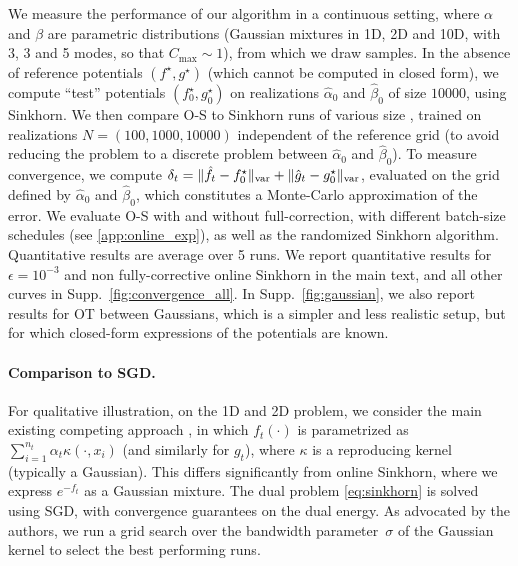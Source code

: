We measure the performance of our algorithm in a
 continuous setting, where $\alpha$ and $\beta$ are  parametric
distributions (Gaussian mixtures in 1D, 2D and 10D, with 3, 3 and 5 modes, so
that $C_{\max} \sim 1$), from which we draw samples. In the absence of reference
potentials $(f^\star, g^\star)$ (which cannot be computed in closed form), 
we compute ``test'' potentials $(f^\star_0, g^\star_0)$ on realizations $\hat
\alpha_0$ and $\hat \beta_0$ of size $10000$, using Sinkhorn. We then compare
O-S to Sinkhorn runs of various size , trained on realizations $N=(100,1000,
10000)$ independent of the reference grid (to avoid reducing the problem to a
discrete problem between $\hat \alpha_0$ and $\hat \beta_0$). To measure
convergence, we compute $\delta_t = \Vert \hat f_t - f^\star_0 \Vert_{\text{\upshape var}} +
\Vert \hat g_t -  g_0^\star \Vert_{\text{\upshape var}}$, evaluated on the grid defined by
$\hat \alpha_0$ and $\hat \beta_0$, which constitutes a Monte-Carlo approximation of the error. 
%
We evaluate O-S with and without full-correction, with
different batch-size schedules (see \autoref{app:online_exp}), as well as the randomized Sinkhorn algorithm. Quantitative results are average over 5 runs. We report quantitative results for $\epsilon = 10^{-3}$ and non fully-corrective online Sinkhorn in the main text, and all other curves in Supp.~\autoref{fig:convergence_all}. In
Supp.~\autoref{fig:gaussian}, we also report results for OT between Gaussians, which is a simpler and less realistic setup, but for which closed-form expressions of the potentials are known.

\paragraph{Comparison to SGD.}\label{sec:compare}
%
For qualitative illustration, on the 1D and 2D problem, we consider the main existing competing
approach \citep{2016-genevay-nips}, in which $f_t(\cdot)$ is parametrized as
$\sum_{i=1}^{n_t} \alpha_t \kappa(\cdot, x_i)$ (and similarly for $g_t$), where
$\kappa$ is a reproducing kernel (typically a Gaussian). This differs
significantly from online Sinkhorn, where we express $e^{-f_t}$ as a Gaussian
mixture. The dual problem \eqref{eq:sinkhorn} is solved using SGD, with convergence guarantees on the dual energy.  As advocated
by the authors, we run a grid search over the bandwidth parameter~$\sigma$ of
the Gaussian kernel to select the best performing runs. 


